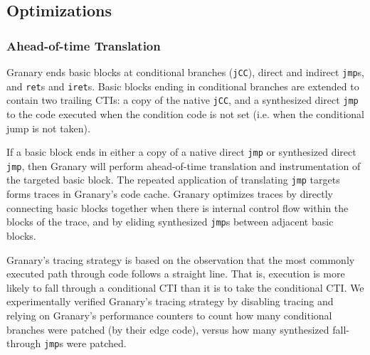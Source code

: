 \documentclass[preprint]{sigplanconf}
\begin{document}


\subsection{Optimizations}
\subsubsection{Ahead-of-time Translation} \label{sec:aot}
Granary ends basic blocks at conditional branches (\texttt{jCC}), direct and indirect \texttt{jmp}s, and \texttt{ret}s and \texttt{iret}s. Basic blocks ending in conditional branches are extended to contain two trailing CTIs: a copy of the native \texttt{jCC}, and a synthesized direct \texttt{jmp} to the code executed when the condition code is not set (i.e. when the conditional jump is not taken).

If a basic block ends in either a copy of a native direct \texttt{jmp} or synthesized direct \texttt{jmp}, then Granary will perform ahead-of-time translation and instrumentation of the targeted basic block. The repeated application of translating \texttt{jmp} targets forms traces in Granary's code cache. Granary optimizes traces by directly connecting basic blocks together when there is internal control flow within the blocks of the trace, and by eliding synthesized \texttt{jmp}s between adjacent basic blocks.

Granary's tracing strategy is based on the observation that the most commonly executed path through code follows a straight line. That is, execution is more likely to fall through a conditional CTI than it is to take the conditional CTI. We experimentally verified Granary's tracing strategy by disabling tracing and relying on Granary's performance counters to count how many conditional branches were patched (by their edge code), versus how many synthesized fall-through \texttt{jmp}s were patched.
\end{document}
